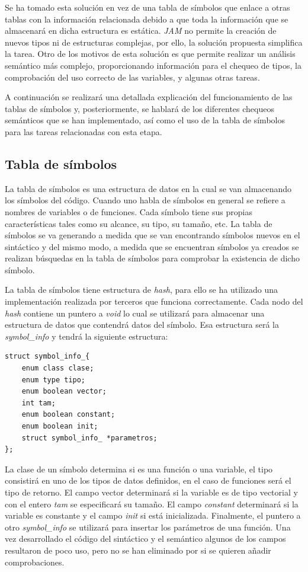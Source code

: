 \documentclass[a4paper,10pt]{article}
\begin{document}
Se ha tomado esta solución en vez de una tabla de símbolos que enlace a otras tablas con la información relacionada debido a que toda la información que se almacenará en dicha estructura es estática. \textit{JAM} no permite la creación de nuevos tipos ni de estructuras complejas, por ello, la solución propuesta simplifica la tarea. Otro de los motivos de esta solución es que permite realizar un análisis semántico más complejo, proporcionando información para el chequeo de tipos, la comprobación del uso correcto de las variables, y algunas otras tareas.

A continuación se realizará una detallada explicación del funcionamiento de las tablas de símbolos y, posteriormente, se hablará de los diferentes chequeos semánticos que se han implementado, así como el uso de la tabla de símbolos para las tareas relacionadas con esta etapa.
\subsection{Tabla de símbolos}

La tabla de símbolos es una estructura de datos en la cual se van almacenando los símbolos del código. Cuando uno habla de símbolos en general se refiere a nombres de variables o de funciones. Cada símbolo tiene sus propias características tales como su alcance, su tipo, su tamaño, etc. La tabla de símbolos se va generando a medida que se van encontrando símbolos nuevos en el sintáctico y del mismo modo, a medida que se encuentran símbolos ya creados se realizan búsquedas en la tabla de símbolos para comprobar la existencia de dicho símbolo.

La tabla de símbolos tiene estructura de \textit{hash}, para ello se ha utilizado una implementación realizada por terceros que funciona correctamente. Cada nodo del \textit{hash} contiene un puntero a \textit{void} lo cual se utilizará para almacenar una estructura de datos que contendrá datos del símbolo. Esa estructura será la \emph{symbol\_info} y tendrá la siguiente estructura:

\begin{lstlisting}
struct symbol_info_{
	enum class clase;
	enum type tipo;
	enum boolean vector;
	int tam;
	enum boolean constant;
	enum boolean init;
	struct symbol_info_ *parametros;
};
\end{lstlisting}

La clase de un símbolo determina si es una función o una variable, el tipo consistirá en uno de los tipos de datos definidos, en el caso de funciones será el tipo de retorno. El campo vector determinará si la variable es de tipo vectorial y con el entero \textit{tam} se especificará su tamaño. El campo \textit{constant} determinará si la variable es constante y el campo \textit{init} si está inicializada. Finalmente, el puntero a otro \textit{symbol\_info} se utilizará para insertar los parámetros de una función. Una vez desarrollado el código del sintáctico y el semántico algunos de los campos resultaron de poco uso, pero no se han eliminado por si se quieren añadir comprobaciones.
\end{document}
